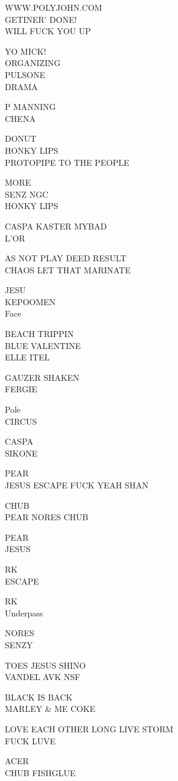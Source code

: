 \documentclass[10pt,letterpaper]{article}
\begin{document}
WWW.POLYJOHN.COM\\
GETINER' DONE!\\
WILL FUCK YOU UP

YO MICK!\\
ORGANIZING\\
PULSONE\\
DRAMA

P MANNING\\
CHENA

DONUT\\
HONKY LIPS\\
PROTOPIPE TO THE PEOPLE

MORE\\
SENZ NGC\\
HONKY LIPS

CASPA KASTER MYBAD\\
L'OR

AS NOT PLAY DEED RESULT\\
CHAOS LET THAT MARINATE

JESU\\
KEPOOMEN\\
Face

BEACH TRIPPIN\\
BLUE VALENTINE\\
ELLE ITEL

GAUZER SHAKEN\\
FERGIE

Pole\\
CIRCUS

CASPA\\
SIKONE

PEAR\\
JESUS ESCAPE FUCK YEAH SHAN

CHUB\\
PEAR NORES CHUB

PEAR\\
JESUS

RK\\
ESCAPE

RK\\
Underpass

NORES\\
SENZY

TOES JESUS SHINO\\
VANDEL AVK NSF

BLACK IS BACK\\
MARLEY \& ME COKE

LOVE EACH OTHER LONG LIVE STORM\\
FUCK LUVE

ACER\\
CHUB FISHGLUE
\end{document}
